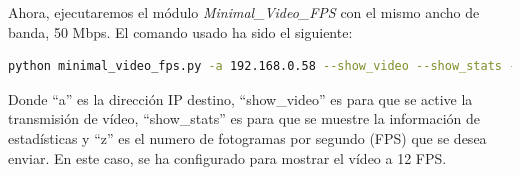 \vspace{\baselineskip}

\newpage

Ahora, ejecutaremos el módulo \textit{Minimal\_Video\_FPS} con el mismo ancho de banda, 50 Mbps. El comando usado ha sido el siguiente:
\begin{lstlisting}[language=bash, basicstyle=\ttfamily\scriptsize]
    python minimal_video_fps.py -a 192.168.0.58 --show_video --show_stats -z 12
\end{lstlisting}
Donde ``a'' es la dirección IP destino, ``show\_video'' es para que se active la transmisión de vídeo, ``show\_stats'' es para que se muestre la información de estadísticas y ``z'' es el numero de fotogramas por segundo (FPS) que se desea enviar. En este caso, se ha configurado para mostrar el vídeo a 12 FPS.
\vspace{\baselineskip}

